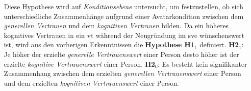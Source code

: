 \documentclass[a4paper,11pt]{article}%
\renewcommand{\\}{\vspace*{0.5\baselineskip} \newline}
\begin{document}
Diese Hypothese wird auf \textit{Konditionsebene} untersucht, um festzustellen, ob sich unterschiedliche Zusammenhänge aufgrund einer Avatarkondition zwischen dem \textit{generellen Vertrauen} und dem \textit{kognitiven Vertrauen} bilden.
Da ein höheres kognitives Vertrauen in ein \ac{vt} während der Neugründung im \ac{sve} wünschenswert ist, wird aus den vorherigen Erkenntnissen die \textbf{Hypothese H1$_{1}$} definiert.\\
\textbf{H2$_{1}$}: Je höher der erzielte \textit{generelle Vertrauenswert} einer Person desto höher ist der erzielte \textit{kognitive Vertrauenswert} einer Person. \newline
\textbf{H2$_{0}$}: Es besteht kein signifikanter Zusammenhang zwischen dem erzielten \textit{generellen Vertrauenswert} einer Person und dem erzielten \textit{kognitiven Vertrauenswert} einer Person.


\end{document}
